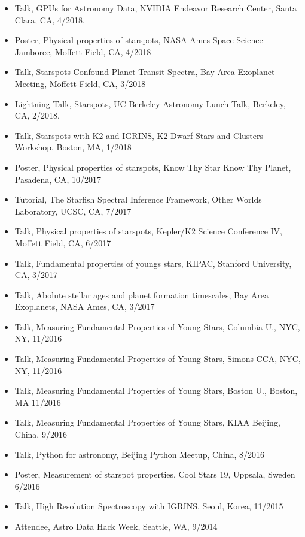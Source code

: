 \documentclass[10pt,letterpaper]{article}
\begin{document}
\begin{itemize}
    \item Talk, \href{https://speakerdeck.com/gully/gpus-for-astronomy-data}{\faSpeakerDeck} GPUs for Astronomy Data, NVIDIA Endeavor Research Center, Santa Clara, CA, 4/2018,
    \item Poster, Physical properties of starspots, NASA Ames Space Science Jamboree, Moffett Field, CA, 4/2018
    \item Talk, Starspots Confound Planet Transit Spectra, Bay Area Exoplanet Meeting, Moffett Field, CA, 3/2018
    \item Lightning Talk, Starspots, UC Berkeley Astronomy Lunch Talk, Berkeley, CA, 2/2018,
    \item Talk, Starspots with K2 and IGRINS, K2 Dwarf Stars and Clusters Workshop, Boston, MA, 1/2018
    \item Poster, Physical properties of starspots, Know Thy Star Know Thy Planet, Pasadena, CA, 10/2017
    \item Tutorial, The Starfish Spectral Inference Framework, Other Worlds Laboratory, UCSC, CA, 7/2017
    \item Talk, Physical properties of starspots, Kepler/K2 Science Conference IV, Moffett Field, CA, 6/2017
    \item Talk, Fundamental properties of youngs stars, KIPAC, Stanford University, CA, 3/2017
    \item Talk, Abolute stellar ages and planet formation timescales, Bay Area Exoplanets, NASA Ames, CA, 3/2017
    \item Talk, \href{https://speakerdeck.com/gully/measuring-fundamental-properties-of-young-stars}{\faSpeakerDeck} Measuring Fundamental Properties of Young Stars, Columbia U., NYC, NY, 11/2016
    \item Talk, Measuring Fundamental Properties of Young Stars, Simons CCA, NYC, NY, 11/2016
    \item Talk, Measuring Fundamental Properties of Young Stars, Boston U., Boston, MA 11/2016
    \item Talk, Measuring Fundamental Properties of Young Stars, KIAA Beijing, China, 9/2016
    \item Talk, Python for astronomy, Beijing Python Meetup, China, 8/2016
    \item Poster, Measurement of starspot properties, Cool Stars 19, Uppsala, Sweden 6/2016
    \item Talk, High Resolution Spectroscopy with IGRINS, Seoul, Korea, 11/2015
    \item Attendee, Astro Data Hack Week, Seattle, WA, 9/2014

\end{itemize}
\end{document}

